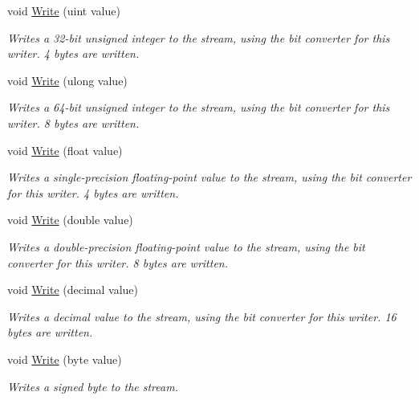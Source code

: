 \begin{DoxyCompactItemize}
void \mbox{\hyperlink{class_t_net_1_1_i_o_1_1_endian_binary_writer_a4cccab9063a2a0f199248ccd34aeb6df}{Write}} (uint value)
\begin{DoxyCompactList}\small\item\em Writes a 32-\/bit unsigned integer to the stream, using the bit converter for this writer. 4 bytes are written. \end{DoxyCompactList}\item 
void \mbox{\hyperlink{class_t_net_1_1_i_o_1_1_endian_binary_writer_af263971a67afaaac4aa920fe9cbace06}{Write}} (ulong value)
\begin{DoxyCompactList}\small\item\em Writes a 64-\/bit unsigned integer to the stream, using the bit converter for this writer. 8 bytes are written. \end{DoxyCompactList}\item 
void \mbox{\hyperlink{class_t_net_1_1_i_o_1_1_endian_binary_writer_a409db831b5ba46bd1c0cec923669e71a}{Write}} (float value)
\begin{DoxyCompactList}\small\item\em Writes a single-\/precision floating-\/point value to the stream, using the bit converter for this writer. 4 bytes are written. \end{DoxyCompactList}\item 
void \mbox{\hyperlink{class_t_net_1_1_i_o_1_1_endian_binary_writer_a9754ae46a8054f3949eba2576a5e15a0}{Write}} (double value)
\begin{DoxyCompactList}\small\item\em Writes a double-\/precision floating-\/point value to the stream, using the bit converter for this writer. 8 bytes are written. \end{DoxyCompactList}\item 
void \mbox{\hyperlink{class_t_net_1_1_i_o_1_1_endian_binary_writer_a60aeee8bbb41fcc3f6b47a4fe7ca05e1}{Write}} (decimal value)
\begin{DoxyCompactList}\small\item\em Writes a decimal value to the stream, using the bit converter for this writer. 16 bytes are written. \end{DoxyCompactList}\item 
void \mbox{\hyperlink{class_t_net_1_1_i_o_1_1_endian_binary_writer_afcd2041bb036d51b0c43e54079056164}{Write}} (byte value)
\begin{DoxyCompactList}\small\item\em Writes a signed byte to the stream. \end{DoxyCompactList}\item 

\end{DoxyCompactItemize}
